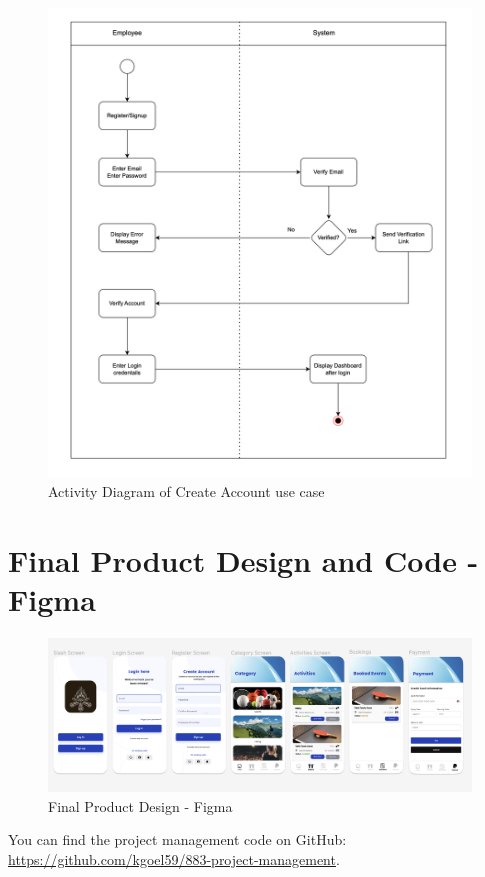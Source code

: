 \begin{figure}[h!t]
    \centering
    \includegraphics[width=\textwidth]{images/activityCreateAccount.png}
    \caption{Activity Diagram of Create Account use case}
    \label{fig:activityCreateAccount}
\end{figure}

\FloatBarrier

\section{Final Product Design and Code - Figma}

\begin{figure}[h!t]
    \centering
    \includegraphics[width=\textwidth]{images/Design.png}
    \caption{Final Product Design - Figma}
    \label{fig:finalproductdesign}
\end{figure}

You can find the project management code on GitHub: \url{https://github.com/kgoel59/883-project-management}.




\FloatBarrier
\newpage